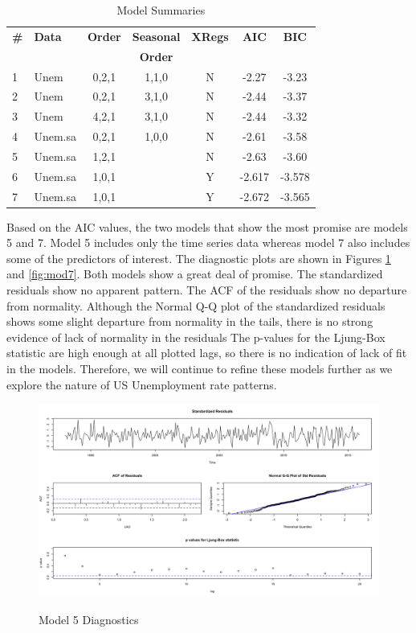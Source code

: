 {     	\begin{table}[H]
     		\centering
     		\caption{Model Summaries}
     		     		\label{tab:models}
     		\begin{tabular}{llccccc}
     			\hline
     			\textbf{\#}& \textbf{Data}  & \textbf{Order} & \textbf{Seasonal} & \textbf{XRegs} & \textbf{AIC} & \textbf{BIC} \\
     			&&&\textbf{Order}&&&\\ 
     			\hline
     			1 & Unem  & 0,2,1 & 1,1,0 & N & -2.27 & -3.23 \\ 
     			2 & Unem  & 0,2,1 & 3,1,0 & N & -2.44 & -3.37 \\ 
     			3 & Unem  & 4,2,1 & 3,1,0 & N & -2.44 & -3.32 \\ 
     			4 & Unem.sa & 0,2,1 & 1,0,0 & N & -2.61 & -3.58 \\ 
     			5 & Unem.sa & 1,2,1 &  & N & -2.63 & -3.60 \\ 
     			6 & Unem.sa & 1,0,1 &  & Y & -2.617 &  -3.578 \\ 
     			7 & Unem.sa & 1,0,1 & & Y& -2.672 &  -3.565\\ \hline
     		\end{tabular}
     	\end{table}

		
		Based on the AIC values, the two models that show the most promise are models 5 and 7.  Model 5 includes only the time series data whereas model 7 also includes some of the predictors of interest.  The diagnostic plots are shown in Figures \ref{fig:mod5} and \ref{fig:mod7}. Both models show a great deal of promise.  The standardized residuals show no apparent pattern. The ACF of the residuals show no departure from normality. Although the Normal Q-Q plot of the standardized residuals shows some slight departure from normality in the tails, there is no strong evidence of lack of normality in the residuals  The p-values for the  Ljung-Box statistic are high enough at all plotted lags, so there is no indication of lack of fit in the models. Therefore, we will continue to refine these models further as we explore the nature of US Unemployment rate patterns.

\begin{figure}[H]
      	\centering
      	\caption{Model 5 Diagnostics}
      	\includegraphics[width=\linewidth]{images/mod5}
      	\label{fig:mod5}
\end{figure}

}
